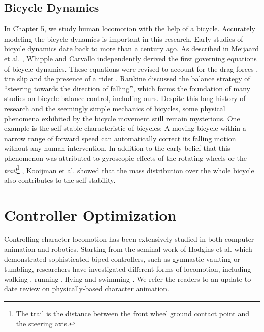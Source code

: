 \subsection{Bicycle Dynamics} In Chapter 5, we study human locomotion with the help of a bicycle. Accurately modeling the bicycle dynamics is important in this research. Early studies of bicycle dynamics date back to more than a century ago. As described in Meijaard et al. \cite{Meijaard2007}, Whipple \cite{Whipple1899} and Carvallo \cite{Carvallo1900} independently derived the first governing equations of bicycle dynamics. These equations were revised to account for the drag forces \cite{Collins1963}, tire slip \cite{Singh1964} and the presence of a rider \cite{van1975method}. Rankine \cite{Rankine1870} discussed the balance strategy of ``steering towards the direction of falling'', which forms the foundation of many studies on bicycle balance control, including ours. Despite this long history of research and the seemingly simple mechanics of bicycles, some physical phenomena exhibited by the bicycle movement still remain mysterious. One example is the self-stable characteristic of bicycles: A moving bicycle within a narrow range of forward speed can automatically correct its falling motion without any human intervention. In addition to the early belief that this phenomenon was attributed to gyroscopic effects of the rotating wheels \cite{Klein1910} or the \emph{trail}\footnote{The trail is the distance between the front wheel ground contact point and the steering axis.} \cite{Jones1970}, Kooijman et al. \cite{Kooijman2011} showed that the mass distribution over the whole bicycle also contributes to the self-stability. 

\section{Controller Optimization}

Controlling character locomotion has been extensively studied in both computer animation and robotics. Starting from the seminal work of Hodgins et al. \cite{Hodgins:1995:AHA} which demonstrated sophisticated biped
controllers, such as gymnastic vaulting or tumbling, researchers have investigated different forms of locomotion, including walking \cite{Yin:2007,Wang:2012}, running \cite{Hodgins:1995:AHA,Kwon:2010}, flying \cite{Wu:2003} and swimming \cite{Grzeszczuk:1995}.  We refer the readers to an update-to-date review \cite{Geijtenbeek2012a} on physically-based character animation.

